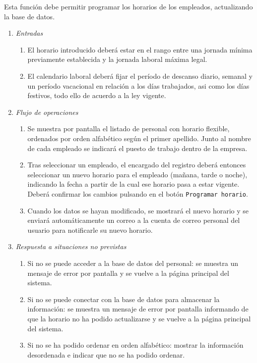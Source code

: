 	Esta función debe permitir programar los horarios de los empleados, actualizando la base de datos.

\begin{enumerate}
	\item \textit{Entradas}
	\begin{enumerate}
		\item El horario introducido deberá estar en el rango entre una jornada mínima previamente establecida y la jornada laboral máxima legal.
		\item El calendario laboral deberá fijar el período de descanso diario, semanal y un período vacacional en relación a los días trabajados, asi como los días festivos, todo ello de acuerdo a la ley vigente.
	\end{enumerate}
	\item \textit{Flujo de operaciones}
	\begin{enumerate}
		\item Se muestra por pantalla el listado de personal con horario flexible, ordenados por orden alfabético según el primer apellido. Junto al nombre de cada empleado se indicará el puesto de trabajo dentro de la empresa.
		\item Tras seleccionar un empleado, el encargado del registro deberá entonces seleccionar un nuevo horario para el empleado (mañana, tarde o noche), indicando la fecha a partir de la cual ese horario pasa a estar vigente. Deberá confirmar los cambios pulsando en el botón \verb|Programar horario|.
		\item Cuando los datos se hayan modificado, se mostrará el nuevo horario y se enviará automáticamente un correo a la cuenta de correo personal del usuario para notificarle su nuevo horario.
	\end{enumerate}
	\item \textit{Respuesta a situaciones no previstas}
	\begin{enumerate}
		\item Si no se puede acceder a la base de datos del personal: se muestra un mensaje de error por pantalla y se vuelve a la página principal del sistema.
		\item Si no se puede conectar con la base de datos para almacenar la información: se muestra un mensaje de error por pantalla informando de que la horario no ha podido actualizarse y se vuelve a la página principal del sistema.
		\item Si no se ha podido ordenar en orden alfabético: mostrar la información desordenada e indicar que no se ha podido ordenar.
	\end{enumerate}

\end{enumerate}
